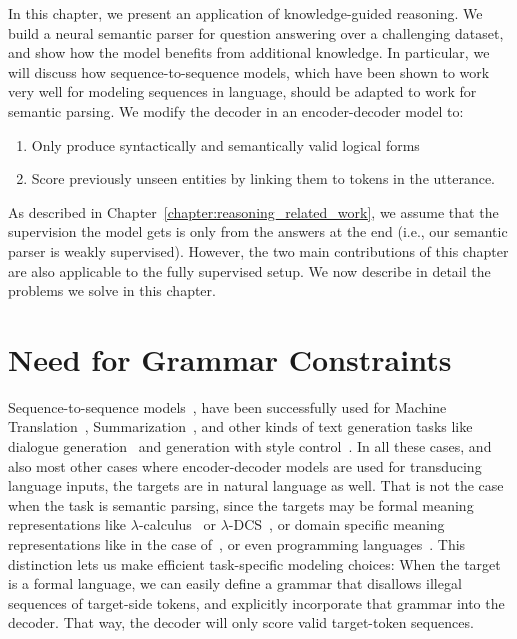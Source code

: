 In this chapter, we present an application of knowledge-guided reasoning. We
build a neural semantic parser for question answering over a challenging
dataset, and show how the model benefits from additional knowledge.
In particular, we will discuss how sequence-to-sequence models, which have
been shown to work very well for modeling sequences in language, should be
adapted to work for semantic parsing. We modify the decoder
in an encoder-decoder model to:
\begin{enumerate}
	\item Only produce syntactically and semantically valid logical forms
	\item Score previously unseen entities by linking them to tokens in the
		utterance.
\end{enumerate}
As described in Chapter~\ref{chapter:reasoning_related_work}, 
we assume that the supervision the model gets is only from the answers at the
end (i.e., our semantic parser is weakly supervised). However, the two main
contributions of this chapter are also applicable to the fully supervised setup.
We now describe in detail the problems we solve in this chapter.

\section{Need for Grammar Constraints}
Sequence-to-sequence models~\citep{sutskever:14}, have been successfully used for Machine
Translation~\citep[among many
others]{sutskever:14,cho2014learning,bahdanau2014neural,wiseman2016sequence,artetxe2017unsupervised},
Summarization~\citep[among others]{Nallapati2016AbstractiveTS,Paulus2017ADR},
and other kinds of text generation tasks like dialogue
generation~\citep[for one]{li2017adversarial} and generation with style
control~\citep[for one]{ficler2017controlling}. In all these cases, and also most
other cases where encoder-decoder models are used for transducing language
inputs, the targets are in natural language as well. That is not the case when
the task is semantic parsing, since the targets may be formal meaning representations
like $\lambda$-calculus~\citep{} or $\lambda$-DCS~\citep{}, or domain specific
meaning representations like in the case of~\citep{}, or even programming
languages~\citep{}. This distinction lets us make efficient task-specific
modeling choices: When the target is a formal language, we can easily define a
grammar that disallows illegal sequences of target-side tokens, and
explicitly incorporate that grammar into the decoder. That way, the decoder will
only score valid target-token sequences.

